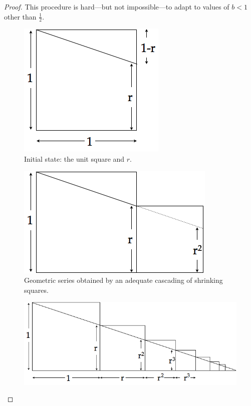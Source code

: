 \begin{proof}

This procedure is hard---but not impossible---to adapt to values of $b
<1$ other than $\frac{1}{2}$.
\begin{figure}[h]
\begin{center}
       \includegraphics[scale=0.4]{FiguresMaths/SumGeometricGeneral1}
\caption{Initial state: the unit square and $r$.}
       \label{fig:sumGeoGeneral}
\end{center}
\end{figure}
\begin{figure}[h]
\begin{center}
       \includegraphics[scale=0.4]{FiguresMaths/SumGeometricGeneral2}
\caption{Geometric series obtained by an adequate cascading of
  shrinking squares.}
       \label{fig:sumGeoGeneral}
\end{center}
\end{figure}
\begin{figure}[h]
\begin{center}
       \includegraphics[scale=0.4]{FiguresMaths/SumGeometricGeneral3}

\end{center}
\end{figure}
\end{proof}
